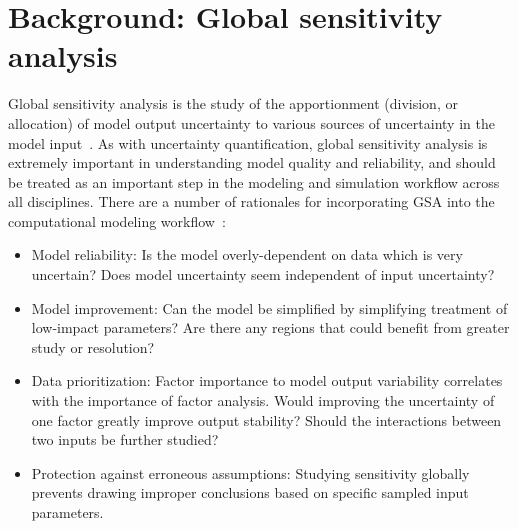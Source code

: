 \section{Background: Global sensitivity analysis}\label{sec:background-gsa}
Global sensitivity analysis is the study of the apportionment (division, or allocation) of model output uncertainty to various sources of uncertainty in the model input~\cite{saltelli2004}. 
As with uncertainty quantification, global sensitivity analysis is extremely important in understanding model quality and reliability, and should be treated as an important step in the modeling and simulation workflow across all disciplines. There are a number of rationales for incorporating GSA into the computational modeling workflow~\cite{saltelli2005}:
\begin{itemize}
    \item Model reliability: Is the model overly-dependent on data which is very uncertain? Does model uncertainty seem independent of input uncertainty?
    \item Model improvement: Can the model be simplified by simplifying treatment of low-impact parameters? Are there any regions that could benefit from greater study or resolution?
    \item Data prioritization: Factor importance to model output variability correlates with the importance of factor analysis. Would improving the uncertainty of one factor greatly improve output stability? Should the interactions between two inputs be further studied?
    \item Protection against erroneous assumptions: Studying sensitivity globally prevents drawing improper conclusions based on specific sampled input parameters.
\end{itemize}
